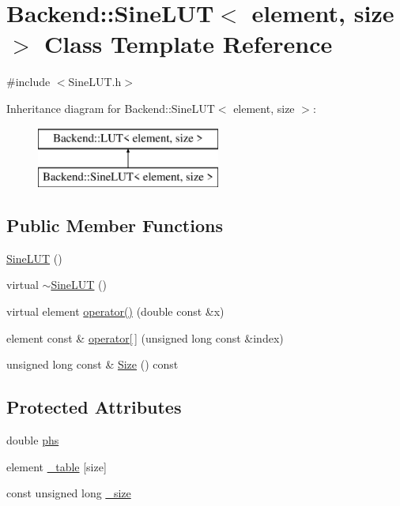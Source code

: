 \hypertarget{class_backend_1_1_sine_l_u_t}{\section{Backend\+:\+:Sine\+L\+U\+T$<$ element, size $>$ Class Template Reference}
\label{class_backend_1_1_sine_l_u_t}
}


{\ttfamily \#include $<$Sine\+L\+U\+T.\+h$>$}

Inheritance diagram for Backend\+:\+:Sine\+L\+U\+T$<$ element, size $>$\+:\begin{figure}[H]
\begin{center}
\leavevmode
\includegraphics[height=2.000000cm]{class_backend_1_1_sine_l_u_t}
\end{center}
\end{figure}
\subsection*{Public Member Functions}
\begin{DoxyCompactItemize}
\item 
\hyperlink{class_backend_1_1_sine_l_u_t_ab2784ed19d66ee885ffe23f3ef9d2214}{Sine\+L\+U\+T} ()
\item 
virtual \hyperlink{class_backend_1_1_sine_l_u_t_aeb5493bee1755391cea3690c31b1665b}{$\sim$\+Sine\+L\+U\+T} ()
\item 
virtual element \hyperlink{class_backend_1_1_sine_l_u_t_a461395dab282ae8ac9b517caf2d6a553}{operator()} (double const \&x)
\item 
element const \& \hyperlink{class_backend_1_1_l_u_t_a9a7c75f36c72778098a091db3269c29c}{operator\mbox{[}$\,$\mbox{]}} (unsigned long const \&index)
\item 
unsigned long const \& \hyperlink{class_backend_1_1_l_u_t_a3ab84f04569e89cd6046da599c6edbae}{Size} () const 
\end{DoxyCompactItemize}
\subsection*{Protected Attributes}
\begin{DoxyCompactItemize}
\item 
double \hyperlink{class_backend_1_1_sine_l_u_t_af5d1e8bc8bda7d41272c17e0f2e9aad8}{phs}
\item 
element \hyperlink{class_backend_1_1_l_u_t_ae70f3f0c9aaa9e0b85517d8e2c61d9a5}{\+\_\+table} \mbox{[}size\mbox{]}
\item 
const unsigned long \hyperlink{class_backend_1_1_l_u_t_a94d2ce1a7c644ce2d4f8e905790b9b54}{\+\_\+size}
\end{DoxyCompactItemize}


